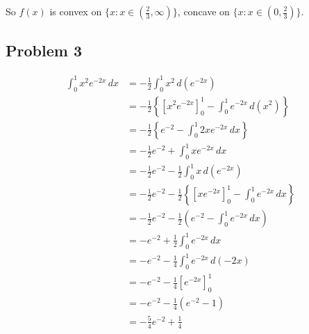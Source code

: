 \documentclass[letterpaper, 11pt]{article}
\newcommand{\1}{\mathds{1}}	%
\theoremstyle{definition}
\begin{document}
So $f(x)$ is convex on $\{x: x \in (\frac{2}{3}, \infty )\}$, concave on $\{x: x \in (0, \frac{2}{3})\}$.

\subsection*{Problem 3}

\begin{align*}
  \int_{0}^{1} x ^{2}e ^{-2x} \, dx & = -\frac{1}{2}\int_{0}^{1} x ^{2} \, d(e ^{-2x})                                                               \\
                                    & = -\frac{1}{2}\left\{\left[x ^{2}e ^{-2x}\right]_{0}^{1} - \int_{0}^{1} e ^{-2x} \, d(x ^{2})\right\}          \\
                                    & =-\frac{1}{2} \left\{e ^{-2} - \int_{0}^{1} 2xe ^{-2x} \, dx\right\}                                           \\
                                    & =-\frac{1}{2}e ^{-2} + \int_{0}^{1} x e ^{-2x} \, dx                                                           \\
                                    & = -\frac{1}{2}e ^{-2} -\frac{1}{2}\int_{0}^{1} x \, d(e ^{-2x})                                                \\
                                    & = -\frac{1}{2}e ^{-2} - \frac{1}{2}\left\{\left[xe ^{-2x}\right]_{0}^{1} - \int_{0}^{1} e ^{-2x} \, dx\right\} \\
                                    & = -\frac{1}{2}e ^{-2} - \frac{1}{2}\left(e ^{-2} - \int_{0}^{1} e ^{-2x} \, dx\right)                          \\
                                    & = -e ^{-2} + \frac{1}{2}\int_{0}^{1} e ^{-2x} \, dx                                                            \\
                                    & = -e ^{-2} - \frac{1}{4}\int_{0}^{1} e ^{-2x} \, d(-2x)                                                        \\
                                    & = -e ^{-2} - \frac{1}{4}\left[e ^{-2x}\right]_{0}^{1}                                                          \\
                                    & = -e ^{-2} - \frac{1}{4}(e ^{-2} - 1)                                                                          \\
                                    & = -\frac{5}{4}e ^{-2} + \frac{1}{4}
\end{align*}
\end{document}
